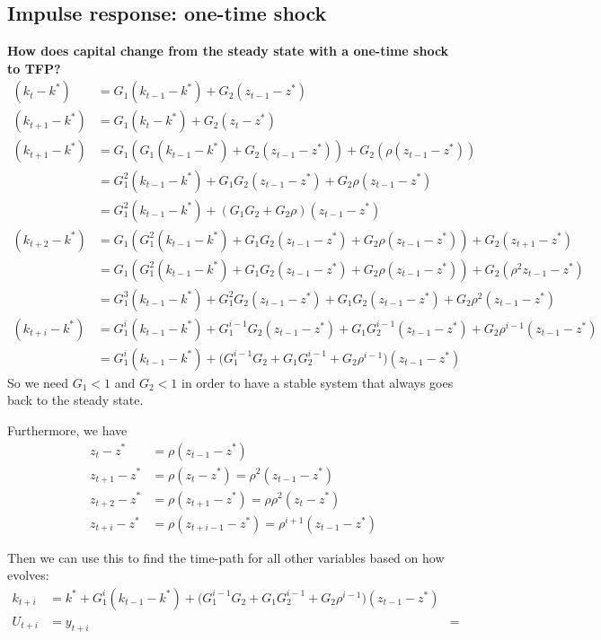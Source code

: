 \documentclass[a4paper]{article}
\theoremstyle{definition}
\begin{document}
\subsection{Impulse response: one-time shock}	
\textbf{How does capital change from the steady state with a one-time shock to TFP?}
	\begin{align*}
	(k_t-k^*)			&= G_1(k_{t-1}-k^*) + G_2(z_{t-1}-z^*) \\
	(k_{t+1}-k^*)	&= G_1(k_{t}-k^*) + G_2(z_{t}-z^*) \\
	(k_{t+1}-k^*)	&= G_1(G_1(k_{t-1}-k^*) + G_2(z_{t-1}-z^*))+G_2(\rho (z_{t-1}-z^*))  \\
						&= G_1^2 (k_{t-1}-k^*) + G_1G_2 (z_{t-1}-z^*)+G_2 \rho (z_{t-1}-z^*) \\
						&= G_1^2 (k_{t-1}-k^*) + (G_1 G_2 + G_2 \rho)(z_{t-1}-z^*) \\
	(k_{t+2}-k^*)	&= G_1(G_1^2 (k_{t-1}-k^*) + G_1G_2 (z_{t-1}-z^*)+G_2 \rho (z_{t-1}-z^*)) + G_2(z_{t+1}-z^*)	\\
						&= G_1(G_1^2 (k_{t-1}-k^*) + G_1G_2 (z_{t-1}-z^*)+G_2 \rho (z_{t-1}-z^*)) + G_2(\rho^2 z_{t-1}-z^*)	\\
						&= G_1^3(k_{t-1}-k^*) + G_1^2 G_2 (z_{t-1}-z^*) + G_1 G_2 (z_{t-1}-z^*) + G_2 \rho^2 (z_{t-1}-z^*) \\
	(k_{t+i}-k^*) 	&= G_1^{i}(k_{t-1}-k^*) + G_1^{i-1}G_2(z_{t-1}-z^*) + G_1 G_2^{i-1} (z_{t-1}-z^*) + G_2 \rho^{i-1}(z_{t-1}-z^*)	 \\
						&= G_1^{i}(k_{t-1}-k^*) + \Big( G_1^{i-1}G_2+G_1 G_2^{i-1}+ G_2 \rho^{i-1} \Big)(z_{t-1}-z^*)			
	\end{align*}
So we need $G_1 < 1$ and $G_2 < 1$ in order to have a stable system that always goes back to the steady state.

Furthermore, we have
	\begin{align*}
	z_t-z^* 		&= \rho(z_{t-1}-z^*) \\
	z_{t+1}-z^* 	&= \rho(z_{t}-z^*) = \rho^2 (z_{t-1}-z^*) \\
	z_{t+2}-z^* 	&= \rho(z_{t+1}-z^*) = \rho \rho^2(z_{t}-z^*) \\
	z_{t+i}-z^* 	&= \rho(z_{t+i-1}-z^*) = \rho^{i+1} (z_{t-1}-z^*)
	\end{align*}

Then we can use this to find the time-path for all other variables based on how evolves:
	\begin{align*}
	k_{t+i} 	&= k^* + G_1^{i}(k_{t-1}-k^*) + \Big( G_1^{i-1}G_2+G_1 G_2^{i-1}+ G_2 \rho^{i-1} \Big)(z_{t-1}-z^*) \\
	U_{t+i} 	&= 
	y_{t+i} 	&= 
	\end{align*}
\end{document}
